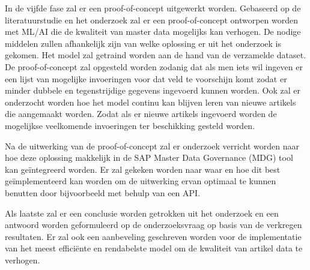 In de vijfde fase zal er een proof-of-concept uitgewerkt worden. Gebaseerd op de literatuurstudie en het onderzoek zal er een proof-of-concept ontworpen worden met ML/AI die de kwaliteit van master data mogelijks kan verhogen. De nodige middelen zullen afhankelijk zijn van welke oplossing er uit het onderzoek is gekomen. Het model zal getraind worden aan de hand van de verzamelde dataset. De proof-of-concept zal opgesteld worden zodanig dat als men iets wil ingeven er een lijst van mogelijke invoeringen voor dat veld te voorschijn komt zodat er minder dubbele en tegenstrijdige gegevens ingevoerd kunnen worden. Ook zal er onderzocht worden hoe het model continu kan blijven leren van nieuwe artikels die aangemaakt worden. Zodat als er nieuwe artikels ingevoerd worden de mogelijkse veelkomende invoeringen ter beschikking gesteld worden.

Na de uitwerking van de proof-of-concept zal er onderzoek verricht worden naar hoe deze oplossing makkelijk in de SAP Master Data Governance (MDG) tool kan geïntegreerd worden. Er zal gekeken worden naar waar en hoe dit best geïmplementeerd kan worden om de uitwerking ervan optimaal te kunnen benutten door bijvoorbeeld met behulp van een API.

Als laatste zal er een conclusie worden getrokken uit het onderzoek en een antwoord worden geformuleerd op de onderzoeksvraag op basis van de verkregen resultaten. Er zal ook een aanbeveling geschreven worden voor de implementatie van het meest efficiënte en rendabelste model om de kwaliteit van artikel data te verhogen.

